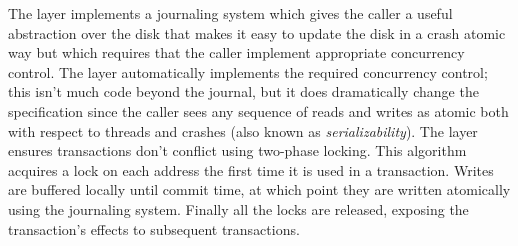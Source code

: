 The  layer implements a journaling system which gives the caller a
useful abstraction over the disk that makes it easy to update the disk in a
crash atomic way but which requires that the caller implement appropriate
concurrency control. The  layer automatically implements the required
concurrency control; this isn't much code beyond the journal, but it does
dramatically change the specification since the caller sees any sequence of
reads and writes as atomic both with respect to threads and crashes (also known
as \emph{serializability}). The  layer ensures transactions don't
conflict using two-phase locking. This algorithm acquires a lock on each address
the first time it is used in a transaction. Writes are buffered locally until
commit time, at which point they are written atomically using the journaling
system. Finally all the locks are released, exposing the transaction's effects
to subsequent transactions.

